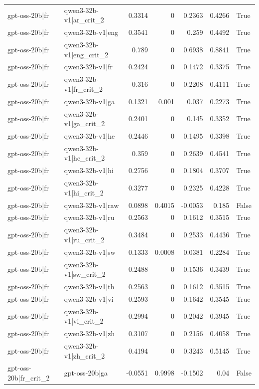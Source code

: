 \begin{table}
\begin{tabular}{l l r r r r l}
gpt-oss-20b|fr & qwen3-32b-v1|ar_crit_2 & 0.3314 & 0 & 0.2363 & 0.4266 & True \\
gpt-oss-20b|fr & qwen3-32b-v1|eng & 0.3541 & 0 & 0.259 & 0.4492 & True \\
gpt-oss-20b|fr & qwen3-32b-v1|eng_crit_2 & 0.789 & 0 & 0.6938 & 0.8841 & True \\
gpt-oss-20b|fr & qwen3-32b-v1|fr & 0.2424 & 0 & 0.1472 & 0.3375 & True \\
gpt-oss-20b|fr & qwen3-32b-v1|fr_crit_2 & 0.316 & 0 & 0.2208 & 0.4111 & True \\
gpt-oss-20b|fr & qwen3-32b-v1|ga & 0.1321 & 0.001 & 0.037 & 0.2273 & True \\
gpt-oss-20b|fr & qwen3-32b-v1|ga_crit_2 & 0.2401 & 0 & 0.145 & 0.3352 & True \\
gpt-oss-20b|fr & qwen3-32b-v1|he & 0.2446 & 0 & 0.1495 & 0.3398 & True \\
gpt-oss-20b|fr & qwen3-32b-v1|he_crit_2 & 0.359 & 0 & 0.2639 & 0.4541 & True \\
gpt-oss-20b|fr & qwen3-32b-v1|hi & 0.2756 & 0 & 0.1804 & 0.3707 & True \\
gpt-oss-20b|fr & qwen3-32b-v1|hi_crit_2 & 0.3277 & 0 & 0.2325 & 0.4228 & True \\
gpt-oss-20b|fr & qwen3-32b-v1|raw & 0.0898 & 0.4015 & -0.0053 & 0.185 & False \\
gpt-oss-20b|fr & qwen3-32b-v1|ru & 0.2563 & 0 & 0.1612 & 0.3515 & True \\
gpt-oss-20b|fr & qwen3-32b-v1|ru_crit_2 & 0.3484 & 0 & 0.2533 & 0.4436 & True \\
gpt-oss-20b|fr & qwen3-32b-v1|sw & 0.1333 & 0.0008 & 0.0381 & 0.2284 & True \\
gpt-oss-20b|fr & qwen3-32b-v1|sw_crit_2 & 0.2488 & 0 & 0.1536 & 0.3439 & True \\
gpt-oss-20b|fr & qwen3-32b-v1|th & 0.2563 & 0 & 0.1612 & 0.3515 & True \\
gpt-oss-20b|fr & qwen3-32b-v1|vi & 0.2593 & 0 & 0.1642 & 0.3545 & True \\
gpt-oss-20b|fr & qwen3-32b-v1|vi_crit_2 & 0.2994 & 0 & 0.2042 & 0.3945 & True \\
gpt-oss-20b|fr & qwen3-32b-v1|zh & 0.3107 & 0 & 0.2156 & 0.4058 & True \\
gpt-oss-20b|fr & qwen3-32b-v1|zh_crit_2 & 0.4194 & 0 & 0.3243 & 0.5145 & True \\
gpt-oss-20b|fr_crit_2 & gpt-oss-20b|ga & -0.0551 & 0.9998 & -0.1502 & 0.04 & False \\

\end{tabular}
\end{table}
